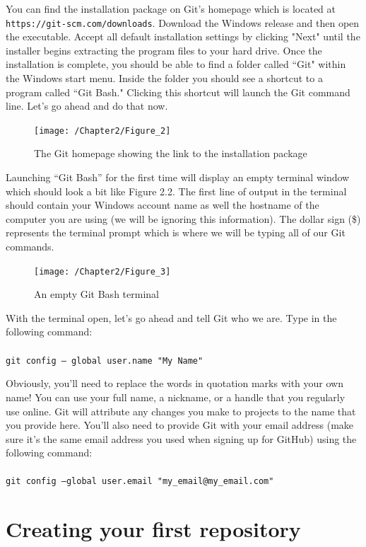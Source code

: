 \documentclass{book}
\begin{document}
You can find the installation package on Git's homepage which is located at \texttt{https://git-scm.com/downloads}. Download the Windows release and then open the executable. Accept all default installation settings by clicking "Next" until the installer begins extracting the program files to your hard drive. Once the installation is complete, you should be able to find a folder called ``Git" within the Windows start menu. Inside the folder you should see a shortcut to a program called ``Git Bash." Clicking this shortcut will launch the Git command line. Let's go ahead and do that now.

\begin{figure}[h]
	\caption{The Git homepage showing the link to the installation package}
	\centering\texttt{[image: /Chapter2/Figure\_2]}
\end{figure}

Launching ``Git Bash'' for the first time will display an empty terminal window which should look a bit like Figure 2.2. The first line of output in the terminal should contain your Windows account name as well the hostname of the computer you are using (we will be ignoring this information). The dollar sign (\$) represents the terminal prompt which is where we will be typing all of our Git commands.

\begin{figure}[h]
	\caption{An empty Git Bash terminal}
	\centering\texttt{[image: /Chapter2/Figure\_3]}
\end{figure}

With the terminal open, let's go ahead and tell Git who we are. Type in the following command:\\ \\ \texttt{git config -- global user.name "My Name"}

Obviously, you'll need to replace the words in quotation marks with your own name! You can use your full name, a nickname, or a handle that you regularly use online. Git will attribute any changes you make to projects to the name that you provide here. You'll also need to provide Git with your email address (make sure it's the same email address you used when signing up for GitHub) using the following command: \\ \\ \texttt{git config --global user.email "my\_email@my\_email.com"}

\section{Creating your first repository}
\end{document}
